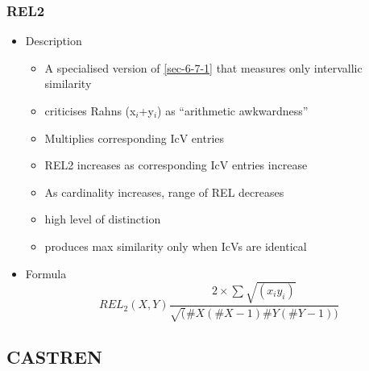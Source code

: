 \documentclass{article}
\begin{document}
\subsubsection{REL2}
\label{sec-6-7-2}
\begin{itemize}

\item Description
\label{sec-6-7-2-1}%
\begin{itemize}
\item A specialised version of \ref{sec-6-7-1} that measures only intervallic
  similarity
\item criticises Rahns (x$_{i}$+y$_{i}$) as ``arithmetic awkwardness''
\item Multiplies corresponding IcV entries
\item REL2 increases as corresponding IcV entries increase
\item As cardinality increases, range of REL decreases
\item high level of distinction
\item produces max similarity only when IcVs are identical
\end{itemize}

\item Formula\\
\label{sec-6-7-2-2}%
$$ REL_{2}(X,Y)\frac{2\times\sum\sqrt{(x_{i}y_{i})}}{\sqrt(\#X(\#X-1)\#Y(\#Y-1))} $$
\end{itemize} %
\subsection{CASTREN}
\label{sec-6-8}
\end{document}
